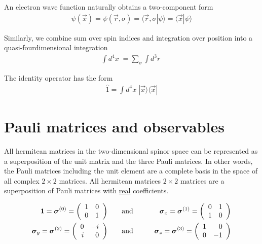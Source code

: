 \documentclass[11pt,a4paper]{report}
\begin{document}
An electron wave function naturally obtains a two-component form
\begin{eqnarray}
\psi(\vec{x})=\psi(\vec{r},\sigma)=\langle\vec{r},\sigma|\psi\rangle
=\langle\vec{x}|\psi\rangle
\label{eq:spinorbdefpsi}
\end{eqnarray}

Similarly, we combine sum over spin indices and integration over
position into a quasi-fourdimensional integration
\begin{eqnarray}
\int d^4x\;=\sum_\sigma\int d^3r\;
\label{eq:spinorbdefint}
\end{eqnarray}

The identity operator has the form
\begin{eqnarray}
\hat{1}=\int d^4x\;|\vec{x}\rangle\langle\vec{x}|
\label{eq:spinorbunity}
\end{eqnarray}

\section{Pauli matrices and observables}
All hermitean matrices in the two-dimensional spinor space can be
represented as a superposition of the unit matrix and the three Pauli
matrices.  In other words, the Pauli matrices including the unit
element are a complete basis in the space of all complex $2\times2$
matrices. All hermitean matrices $2\times2$ matrices are a
superposition of Pauli matrices with \underline{real} coefficients.

\begin{eqnarray}
\bm{1}=\bm{\sigma}^{(0)}=\left(\begin{array}{rr}1&0\\0&1\end{array}\right)
&\qquad\text{and}\qquad&
\bm{\sigma}_x=\bm{\sigma}^{(1)}=\left(\begin{array}{cc}0&1\\1&0\end{array}\right)
\nonumber\\
\bm{\sigma}_y=\bm{\sigma}^{(2)}=\left(\begin{array}{rr}0&-i\\i&0\end{array}\right)
&\qquad\text{and}\qquad&
\bm{\sigma}_z=\bm{\sigma}^{(3)}=\left(\begin{array}{rr}1&0\\0&-1\end{array}\right)
\label{eq:defpaulimatrices}
\end{eqnarray}
\end{document}
